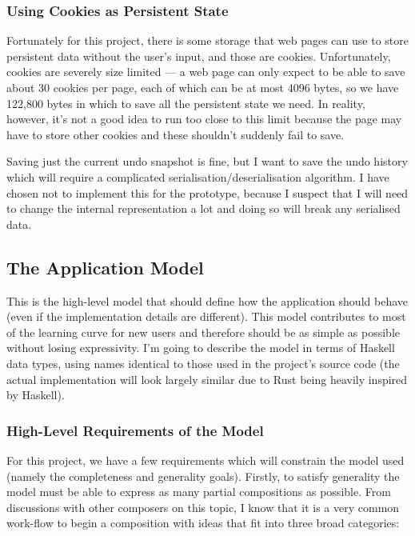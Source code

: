\documentclass[12pt]{article}
\begin{document}
\subsubsection{Using Cookies as Persistent State}

Fortunately for this project, there is some storage that web pages can use to store persistent data
without the user's input, and those are cookies.  Unfortunately, cookies are severely size limited
--- a web page can only expect to be able to save about 30 cookies per page, each of which can be at
most 4096 bytes, so we have 122,800 bytes in which to save all the persistent state we need.  In
reality, however, it's not a good idea to run too close to this limit because the page may have to
store other cookies and these shouldn't suddenly fail to save.

Saving just the current undo snapshot is fine, but I want to save the undo history which will
require a complicated serialisation/deserialisation algorithm.  I have chosen not to implement this
for the prototype, because I suspect that I will need to change the internal representation a lot
and doing so will break any serialised data.

\subsection{The Application Model}

This is the high-level model that should define how the application should behave (even if the
implementation details are different).  This model contributes to most of the learning curve for new
users and therefore should be as simple as possible without losing expressivity.  I'm going to
describe the model in terms of Haskell data types, using names identical to those used in the
project's source code (the actual implementation will look largely similar due to Rust being heavily
inspired by Haskell).

\subsubsection{High-Level Requirements of the Model}

For this project, we have a few requirements which will constrain the model used (namely the
completeness and generality goals).  Firstly, to satisfy generality the model must be able to
express as many partial compositions as possible.  From discussions with other composers on this
topic, I know that it is a very common work-flow to begin a composition with ideas that fit into
three broad categories:
\end{document}
